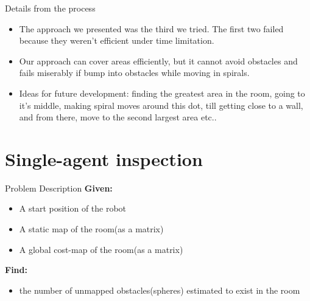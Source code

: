\documentclass[10pt]{beamer}
\begin{document}
\begin{frame}{Details from the process}

\begin{itemize}
    \item The approach we presented was the third we tried. The first two failed because they weren't efficient under time limitation.
    \item Our approach can cover areas efficiently, but it cannot avoid obstacles and fails miserably if bump into obstacles while moving in spirals.
    \item Ideas for future development: finding the greatest area in the room, going to it's middle, making spiral moves around this dot, till getting close to a wall, and from there, move to the second largest area etc..
\end{itemize}

\end{frame}

\section{Single-agent inspection}

\begin{frame}{Problem Description}
\textbf{Given:}

\begin{itemize}
    \item A start position of the robot
    \item A static map of the room(as a matrix)
    \item A global cost-map of the room(as a matrix) 
\end{itemize}

\textbf{Find:}

\begin{itemize}
    \item the number of unmapped obstacles(spheres) estimated to exist in the room
\end{itemize}
\end{frame}
\end{document}
